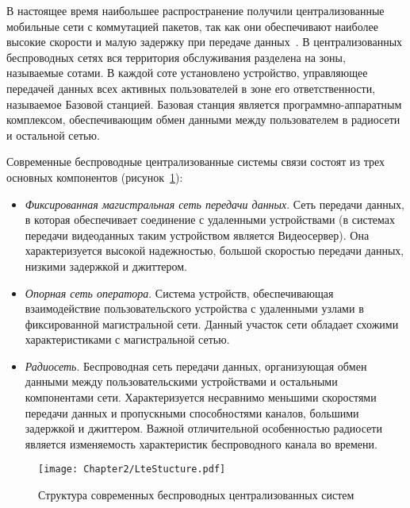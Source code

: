 В настоящее время наибольшее распространение получили централизованные мобильные сети с коммутацией пакетов, так как они обеспечивают наиболее высокие скорости и малую задержку при передаче данных~\cite{Cisco}. В централизованных беспроводных сетях вся территория обслуживания разделена на зоны, называемые сотами. В каждой соте установлено устройство, управляющее передачей данных всех активных пользователей в зоне его ответственности, называемое Базовой станцией. Базовая станция является программно-аппаратным комплексом, обеспечивающим обмен данными между пользователем в радиосети и остальной сетью.

Современные беспроводные централизованные системы связи состоят из трех основных компонентов (рисунок~\ref{fig:LteStructure}):
\begin{itemize}
  \item \textit{Фиксированная магистральная сеть передачи данных}. Сеть передачи данных, в которая обеспечивает соединение с удаленными устройствами (в системах передачи видеоданных таким устройством является Видеосервер). Она характеризуется высокой надежностью, большой скоростью передачи данных, низкими задержкой и джиттером.
  \item \textit{Опорная сеть оператора}. Система устройств, обеспечивающая взаимодействие пользовательского устройства с удаленными узлами в фиксированной магистральной сети. Данный участок сети обладает схожими характеристиками с магистральной сетью.
  \item \textit{Радиосеть}. Беспроводная сеть передачи данных, организующая обмен данными между пользовательскими устройствами и остальными компонентами сети. Характеризуется несравнимо меньшими скоростями передачи данных и пропускными способностями каналов, большими задержкой и джиттером. Важной отличительной особенностью радиосети является изменяемость характеристик беспроводного канала во времени.
\end{itemize}

\begin{figure}[htbp]
\begin{center}
\texttt{[image: Chapter2/LteStucture.pdf]}
\caption{Структура современных беспроводных централизованных систем}
\label{fig:LteStructure}
\end{center}
\end{figure}

